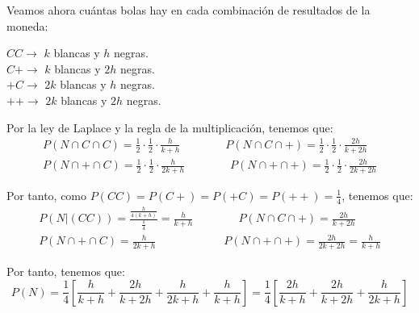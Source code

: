 \begin{ejercicio}
    Veamos ahora cuántas bolas hay en cada combinación de resultados de la moneda:
    \begin{center}
        $CC \longrightarrow $ $k$ blancas y $h$ negras. \\
        $C+ \longrightarrow $ $k$ blancas y $2h$ negras. \\
        $+C \longrightarrow $ $2k$ blancas y $h$ negras. \\
        $++ \longrightarrow $ $2k$ blancas y $2h$ negras. \\
    \end{center}

    Por la ley de Laplace y la regla de la multiplicación, tenemos que:
    \begin{gather*}
        P(N\cap C\cap C) = \frac{1}{2}\cdot \frac{1}{2}\cdot \frac{h}{k+h}
        \qquad \qquad
        P(N\cap C\cap +) = \frac{1}{2}\cdot \frac{1}{2}\cdot \frac{2h}{k+2h}
        \\
        P(N\cap +\cap C) = \frac{1}{2}\cdot \frac{1}{2}\cdot \frac{h}{2k+h}
        \qquad \qquad
        P(N\cap +\cap +) = \frac{1}{2}\cdot \frac{1}{2}\cdot \frac{2h}{2k+2h}
    \end{gather*}

    Por tanto, como $P(CC) = P(C+) = P(+C) = P(++) = \frac{1}{4}$, tenemos que:
    \begin{gather*}
        P(N|(CC)) = \frac{\frac{h}{4(k+h)}}{\frac{1}{4}} = \frac{h}{k+h}
        \qquad \qquad
        P(N\cap C\cap +) = \frac{2h}{k+2h}
        \\
        P(N\cap +\cap C) = \frac{h}{2k+h}
        \qquad \qquad \qquad
        P(N\cap +\cap +) = \frac{2h}{2k+2h} = \frac{h}{k+h}
    \end{gather*}

    Por tanto, tenemos que:
    \begin{equation*}
        P(N) = \frac{1}{4}\left[\frac{h}{k+h} + \frac{2h}{k+2h} + \frac{h}{2k+h} + \frac{h}{k+h}\right]
        = \frac{1}{4}\left[\frac{2h}{k+h} + \frac{2h}{k+2h} + \frac{h}{2k+h}\right]
    \end{equation*}
    
\end{ejercicio}